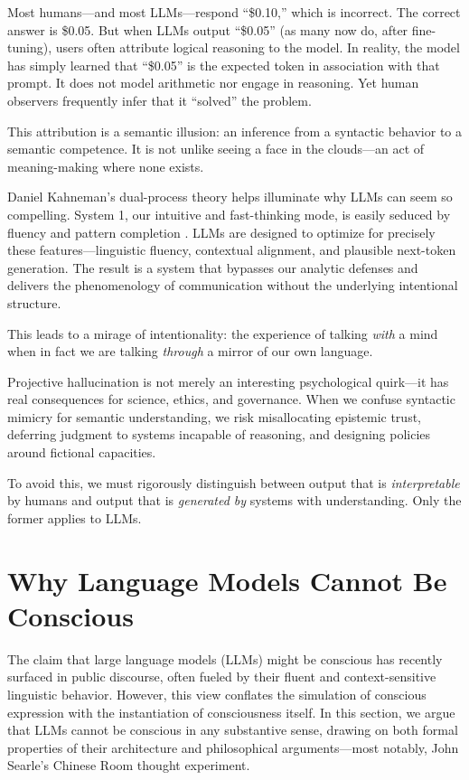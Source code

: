 \documentclass[12pt]{article}
\theoremstyle{plain}
\theoremstyle{definition}
\theoremstyle{remark}
\begin{document}
Most humans—and most LLMs—respond “\$0.10,” which is incorrect. The correct answer is \$0.05. But when LLMs output “\$0.05” (as many now do, after fine-tuning), users often attribute logical reasoning to the model. In reality, the model has simply learned that “\$0.05” is the expected token in association with that prompt. It does not model arithmetic nor engage in reasoning. Yet human observers frequently infer that it “solved” the problem.

This attribution is a semantic illusion: an inference from a syntactic behavior to a semantic competence. It is not unlike seeing a face in the clouds—an act of meaning-making where none exists.

Daniel Kahneman’s dual-process theory helps illuminate why LLMs can seem so compelling. System 1, our intuitive and fast-thinking mode, is easily seduced by fluency and pattern completion \parencite{kahneman2011thinking}. LLMs are designed to optimize for precisely these features—linguistic fluency, contextual alignment, and plausible next-token generation. The result is a system that bypasses our analytic defenses and delivers the phenomenology of communication without the underlying intentional structure.

This leads to a mirage of intentionality: the experience of talking \textit{with} a mind when in fact we are talking \textit{through} a mirror of our own language.

Projective hallucination is not merely an interesting psychological quirk—it has real consequences for science, ethics, and governance. When we confuse syntactic mimicry for semantic understanding, we risk misallocating epistemic trust, deferring judgment to systems incapable of reasoning, and designing policies around fictional capacities.

To avoid this, we must rigorously distinguish between output that is \textit{interpretable} by humans and output that is \textit{generated by} systems with understanding. Only the former applies to LLMs.

\section{Why Language Models Cannot Be Conscious}

The claim that large language models (LLMs) might be conscious has recently surfaced in public discourse, often fueled by their fluent and context-sensitive linguistic behavior. However, this view conflates the simulation of conscious expression with the instantiation of consciousness itself. In this section, we argue that LLMs cannot be conscious in any substantive sense, drawing on both formal properties of their architecture and philosophical arguments—most notably, John Searle’s Chinese Room thought experiment.
\end{document}

